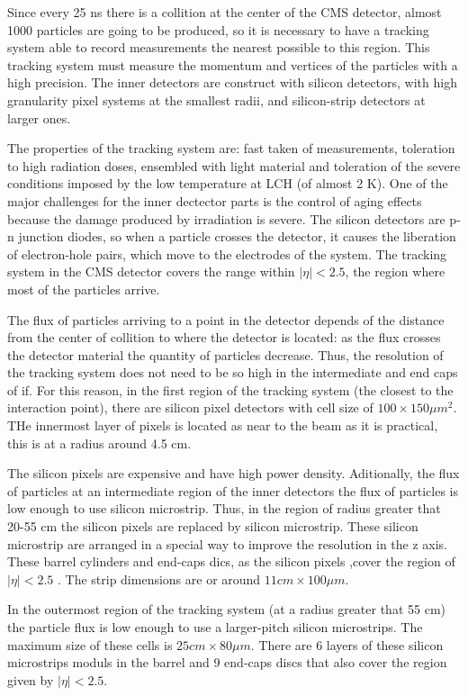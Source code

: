 Since every 25 ns there is a collition at the center of the CMS detector, almost 1000 particles are going to be produced, so it is necessary to have a tracking system able to record measurements the nearest possible to this region. This tracking system must measure the momentum and vertices of the particles with a high precision. The inner detectors are construct with silicon detectors, with high granularity pixel systems at the smallest radii, and silicon-strip detectors at larger ones. 

The properties of the tracking system are: fast taken of measurements, toleration to high radiation doses, ensembled with light material and toleration of the severe conditions imposed by the low temperature at LCH (of almost 2 K). One of the major challenges for the inner dectector parts is the control of aging effects because the damage produced by irradiation is severe. The silicon detectors are p-n junction diodes, so when a particle crosses the detector, it causes the liberation of electron-hole pairs, which move to the electrodes of the system. The tracking system in the CMS detector covers the range within $|\eta|<2.5$, the region where most of the particles arrive. 

The flux of particles arriving to a point in the detector depends of the distance from the center of collition to where the detector is located: as the flux crosses the detector material the quantity of particles decrease. Thus, the resolution of the tracking system does not need to be so high in the intermediate and end caps of if. For this reason, in the first region of the tracking system (the closest to the interaction point), there are silicon pixel detectors with cell size of $100 \times 150 \mu m^2$. THe innermost layer of pixels is located as near to the beam as it is practical, this is at a radius around 4.5 cm.
 
The silicon pixels are expensive and have high power density. Aditionally, the flux of particles at an intermediate region of the inner detectors the flux of particles is low enough to use silicon microstrip. Thus, in the region of radius greater that 20-55 cm the silicon pixels are replaced by silicon microstrip. These silicon microstrip are arranged in a special way to improve the resolution in the z axis. These barrel cylinders and end-caps dics, as the silicon pixels ,cover the region of $|\eta| < 2.5$ . The strip dimensions are or around $11 cm \times 100 \mu m$.

In the outermost region of the tracking system (at a radius greater that 55 cm) the particle flux is low enough to use a larger-pitch silicon microstrips. The maximum size of these cells is $25cm \times 80 \mu m$. There are 6 layers of these silicon microstrips moduls in the barrel and 9 end-caps discs that also cover the region given by $|\eta|< 2.5$.

